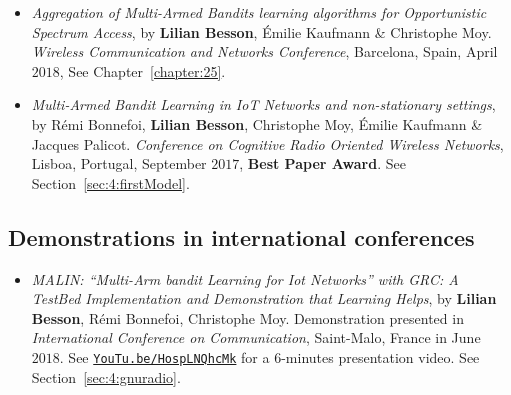 \begin{itemize}
\item
    \emph{Aggregation of Multi-Armed Bandits learning algorithms for Opportunistic Spectrum Access},
    by \textbf{Lilian Besson}, Émilie Kaufmann \& Christophe Moy.
    \emph{Wireless Communication and Networks Conference},
    Barcelona, Spain, April $2018$,
    See Chapter~\ref{chapter:25}.
    \cite{Besson2018WCNC}

\item
    \emph{Multi-Armed Bandit Learning in IoT Networks and non-stationary settings},
    by Rémi Bonnefoi, \textbf{Lilian Besson}, Christophe Moy, Émilie Kaufmann \& Jacques Palicot.
    \emph{Conference on Cognitive Radio Oriented Wireless Networks},
    Lisboa, Portugal, September $2017$,
    \textbf{Best Paper Award}.
    See Section~\ref{sec:4:firstModel}.
    \cite{Bonnefoi17}

\end{itemize}

\subsection*{Demonstrations in international conferences}

\begin{itemize}

\item
    \emph{MALIN: ``Multi-Arm bandit Learning for Iot Networks'' with GRC: A TestBed Implementation and Demonstration that Learning Helps},
    by \textbf{Lilian Besson}, Rémi Bonnefoi, Christophe Moy.
    Demonstration presented in \emph{International Conference on Communication},
    Saint-Malo, France in June $2018$.
    See \href{https://YouTu.be/HospLNQhcMk}{\texttt{YouTu.be/HospLNQhcMk}} for a $6$-minutes presentation video.
    See Section~\ref{sec:4:gnuradio}.
    \cite{Besson2018ICT}

\end{itemize}


